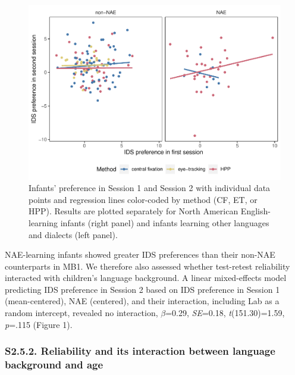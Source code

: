 \documentclass[
  man, donotrepeattitle,floatsintext]{apa6}
\begin{document}
\begin{figure}
\centering
\includegraphics{MB1T_supplement_files/figure-latex/unnamed-chunk-13-1.pdf}
\caption{\label{fig:unnamed-chunk-13}Infants' preference in Session 1 and Session 2 with individual data points and regression lines color-coded by method (CF, ET, or HPP). Results are plotted separately for North American English-learning infants (right panel) and infants learning other languages and dialects (left panel).}
\end{figure}

NAE-learning infants showed greater IDS preferences than their non-NAE counterparts in MB1.
We therefore also assessed whether test-retest reliability interacted with children's language background.
A linear mixed-effects model predicting IDS preference in Session 2 based on IDS preference in Session 1 (mean-centered), NAE (centered), and their interaction, including Lab as a random intercept, revealed no interaction, \(\beta\)=0.29, \emph{SE}=0.18, \emph{t}(151.30)=1.59, \emph{p}=.115 (Figure 1).

\hypertarget{s2.5.2.-reliability-and-its-interaction-between-language-background-and-age}{%
\subsubsection{S2.5.2. Reliability and its interaction between language background and age}\label{s2.5.2.-reliability-and-its-interaction-between-language-background-and-age}}
\end{document}
